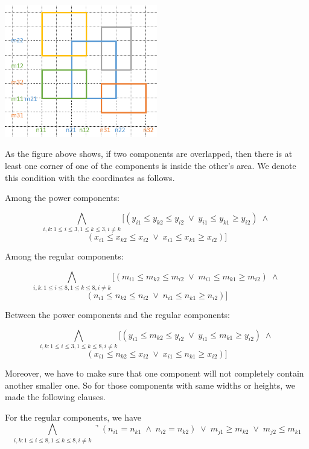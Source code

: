 \documentclass[11pt]{article}
\begin{document}
{\begin{description}
\begin{center}
\includegraphics[width=0.5\textwidth]{Part1_2_1.png}
\end{center}

  As the figure above shows, if two components are overlapped, then there is at least one corner of one of the components is inside the other's area.
  We denote this condition with the coordinates as follows.

  Among the power components:

  \[  \bigwedge_{i,k: 1 \leq i \leq 3, 1 \leq k \leq 3, i \neq k}
  [ (y_{i1} \leq y_{k2} \leq y_{i2} \; \vee \; y_{i1} \leq y_{k1} \geq y_{i2}) \; \wedge \; \]
  \[ (x_{i1} \leq x_{k2} \leq x_{i2} \; \vee \; x_{i1} \leq x_{k1} \geq x_{i2}) ]  \]

  Among the regular components:

  \[  \bigwedge_{i,k: 1 \leq i \leq 8, 1 \leq k \leq 8, i \neq k}
  [ (m_{i1} \leq m_{k2} \leq m_{i2} \; \vee \; m_{i1} \leq m_{k1} \geq m_{i2}) \; \wedge \; \]
  \[ (n_{i1} \leq n_{k2} \leq n_{i2} \; \vee \; n_{i1} \leq n_{k1} \geq n_{i2}) ] \]

  Between the power components and the regular components:

  \[  \bigwedge_{i,k: 1 \leq i \leq 3, 1 \leq k \leq 8, i \neq k}
  [ (y_{i1} \leq m_{k2} \leq y_{i2} \; \vee \; y_{i1} \leq m_{k1} \geq y_{i2}) \; \wedge \; \]
  \[ (x_{i1} \leq n_{k2} \leq x_{i2} \; \vee \; x_{i1} \leq n_{k1} \geq x_{i2}) ] \]

  Moreover, we have to make sure that one component will not completely contain another smaller one.
  So for those components with same widths or heights, we made the following clauses.

  For the regular components, we have
  \[  \bigwedge_{i,k: 1 \leq i \leq 8, 1 \leq k \leq 8, i \neq k}
  \urcorner (n_{i1} = n_{k1} \; \wedge \; n_{i2} = n_{k2}) \; \vee \; m_{j1} \geq m_{k2} \; \vee \; m_{j2} \leq m_{k1} \]


\end{description}}
\end{document}
